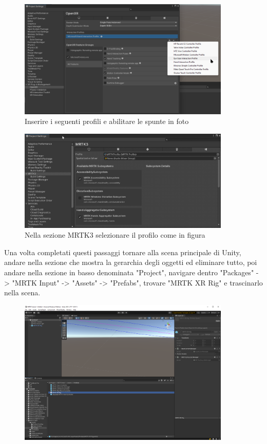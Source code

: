 \begin{figure}[H]
    \centering
    \includegraphics[width=0.9\textwidth,height=\textheight,keepaspectratio]{figures/chapter_1/projectSetting4.png}
    \caption{Inserire i seguenti profili e abilitare le spunte in foto}
\end{figure}
\begin{figure}[H]
    \centering
    \includegraphics[width=0.9\textwidth,height=\textheight,keepaspectratio]{figures/chapter_1/projectSetting5.png}
    \caption{Nella sezione MRTK3 selezionare il profilo come in figura}
\end{figure}
Una volta completati questi passaggi tornare alla scena principale di Unity, andare nella sezione che mostra la gerarchia degli oggetti ed eliminare tutto, poi andare nella sezione in basso denominata "Project", navigare dentro "Packages" -> "MRTK Input" -> "Assets" -> "Prefabs", trovare "MRTK XR Rig" e trascinarlo nella scena.
\begin{figure}[H]
    \centering
    \includegraphics[width=0.9\textwidth,height=\textheight,keepaspectratio]{figures/chapter_1/mrtk-xr-rig-prefab.png}
    \caption{}
\end{figure}

